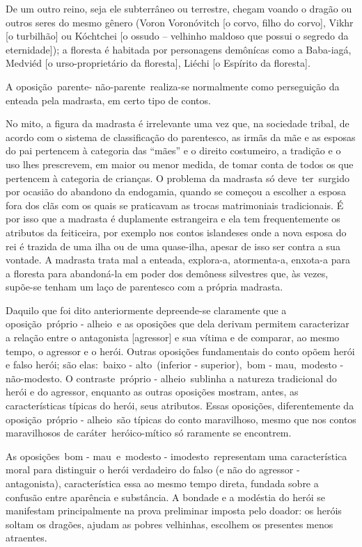 De um outro reino, seja ele subterrâneo ou terrestre, chegam voando o
dragão ou outros seres do mesmo gênero (Voron Voronóvitch {[}o corvo,
filho do corvo{]}, Vikhr {[}o turbilhão{]} ou Kóchtchei {[}o ossudo --
velhinho maldoso que possui o segredo da eternidade{]}); a floresta é
habitada por personagens demônícas como a Baba-iagá, Medviéd {[}o
urso-proprietário da floresta{]}, Liéchi {[}o Espírito da floresta{]}.

A oposição~{parente- não-parente}~realiza-se normalmente como
perseguição da enteada pela madrasta, em certo tipo de contos.

No mito, a figura da madrasta é irrelevante uma vez que, na sociedade
tribal, de acordo com o sistema de classificação do parentesco, as irmãs
da mãe e as esposas do pai pertencem à categoria das ``mães'' e o
direito costumeiro, a tradição e o uso lhes prescrevem, em maior ou
menor medida, de tomar conta de todos os que pertencem à categoria de
crianças. O problema da madrasta só deve~ter~surgido por ocasião do
abandono da endogamia, quando se começou a escolher a esposa fora dos
clãs com os quais se praticavam as trocas matrimoniais tradicionais. É
por isso que a madrasta é duplamente estrangeira e ela tem
frequentemente os atributos da feiticeira, por exemplo nos contos
islandeses onde a nova esposa do rei é trazida de uma ilha ou de uma
quase-ilha, apesar de isso ser contra a sua vontade. A madrasta trata
mal a enteada, explora-a, atormenta-a, enxota-a para a floresta para
abandoná-la em poder dos demôness silvestres que, às vezes, supõe-se
tenham um laço de parentesco com a própria madrasta.

Daquilo que foi dito anteriormente depreende-se claramente que a
oposição~{próprio - alheio}~e as oposições que dela derivam permitem
caracterizar a relação entre o antagonista {[}agressor{]} e sua vítima e
de comparar, ao mesmo tempo, o agressor e o herói. Outras oposições
fundamentais do conto opõem herói e falso herói; são elas:~{baixo -
alto}~(inferior - superior),~{bom - mau},~{modesto - não-modesto}. O
contraste~{próprio - alheio}~sublinha a natureza tradicional do herói e
do agressor, enquanto as outras oposições mostram, antes, as
características típicas do herói, seus atributos. Essas oposições,
diferentemente da oposição~{próprio - alheio}~são típicas do conto
maravilhoso, mesmo que nos contos maravilhosos de caráter~heróico-mítico
só raramente se encontrem.

As oposições~{bom - mau}~e~{modesto - imodesto}~representam uma
característica moral para distinguir o herói verdadeiro do falso (e não
do agressor - antagonista), característica essa ao mesmo tempo direta,
fundada sobre a confusão entre aparência e substância. A bondade e a
modéstia do herói se manifestam principalmente na prova preliminar
imposta pelo doador: os heróis soltam os dragões, ajudam as pobres
velhinhas, escolhem os presentes menos atraentes.

